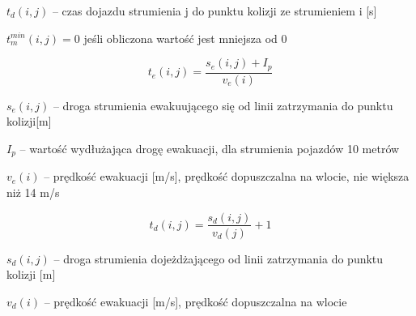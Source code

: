 \begin{math} t_{d} (i,j) \end{math} \textrm{ -- czas dojazdu strumienia j do punktu kolizji ze strumieniem i [s]}

\begin{math} t^{min}_{m} (i,j) = 0 \end{math} \textrm{ jeśli obliczona wartość jest mniejsza od 0}

\begin{equation}
	t_{e} (i,j) = \frac{s_{e} (i,j) + I_p}{v_{e} (i)}
\end{equation}

\begin{math} s_{e} (i,j) \end{math} \textrm{ -- droga strumienia ewakuującego się od linii zatrzymania do punktu kolizji[m]}

\begin{math} I_p \end{math} \textrm{ -- wartość wydłużająca drogę ewakuacji, dla strumienia pojazdów 10 metrów}

\begin{math} v_{e} (i) \end{math} \textrm{ -- prędkość ewakuacji [m/s], prędkość dopuszczalna na wlocie, nie większa niż 14 m/s}

\begin{equation}
	t_{d} (i,j) = \frac{s_{d} (i,j)}{v_{d} (j)} + 1
\end{equation}

\begin{math} s_{d} (i,j) \end{math} \textrm{ -- droga strumienia dojeżdżającego od linii zatrzymania do punktu kolizji [m]}

\begin{math} v_{d} (i) \end{math} \textrm{ -- prędkość ewakuacji [m/s], prędkość dopuszczalna na wlocie}